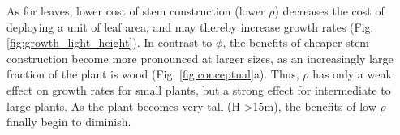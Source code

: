 \documentclass[a4paper,11pt]{article}
\begin{document}

As for leaves, lower cost of stem construction (lower $\rho$) decreases the cost of deploying a unit of leaf area, and may thereby increase growth rates (Fig. \ref{fig:growth_light_height}). In contrast to $\phi$, the benefits of cheaper stem construction become more pronounced at larger sizes, as an increasingly large fraction of the plant is wood (Fig. \ref{fig:conceptual}a). Thus, $\rho$ has only a weak effect on growth rates for small plants, but a strong effect for intermediate to large plants. As the plant becomes very tall (H \textgreater 15m), the benefits of low $\rho$ finally begin to diminish.
\end{document}
